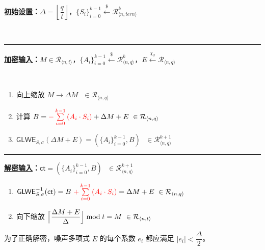 \begin{tcolorbox}[title={\textbf{\tboxlabel{\ref*{subsec:glwe-alternative}} GLWE 密码体制的另一种形式}}]

\textbf{\underline{初始设置}：}$\Delta = \left\lfloor\dfrac{q}{t}\right\rfloor$，$\{S_i\}_{i=0}^{k-1} \xleftarrow{\$} \mathcal{R}_{\langle n, \textit{tern} \rangle}^k$

$ $

\par\noindent\rule{\textwidth}{0.4pt}


\textbf{\underline{加密输入}：}$M \in \mathcal{R}_{\langle n, t \rangle}$，$\{A_i\}_{i=0}^{k-1} \xleftarrow{\$} \mathcal{R}_{\langle n,q \rangle}^{k}$，$E \xleftarrow{\chi_\sigma} \mathcal{R}_{\langle n,q \rangle}$

$ $

\begin{enumerate}
\item 向上缩放 $M \longrightarrow \Delta M \text { } \in \mathcal{R}_{\langle n, q\rangle}$

\item 计算 $B = \textcolor{red}{-\sum\limits_{i=0}^{k-1}{(A_i \cdot S_i)}} + \Delta  M + E \text{ } \in \mathcal{R}_{\langle n,q \rangle}$

\item $\textsf{GLWE}_{S,\sigma}(\Delta M + E) = (\{A_i\}_{i=0}^{k-1}, B) \text{ } \in \mathcal{R}_{\langle n,q \rangle}^{k + 1}$ 

\end{enumerate}

\par\noindent\rule{\textwidth}{0.4pt}


\textbf{\underline{解密输入}：}$\textsf{ct} = (\{A_i\}_{i=0}^{k-1}, B) \text{ } \in \mathcal{R}_{\langle n,q \rangle}^{k + 1}$

\begin{enumerate}
\item $\textsf{GLWE}^{-1}_{S,\sigma}(\textsf{ct}) = B \text{ } \textcolor{red}{ + \sum\limits_{i=0}^{k-1}{(A_i \cdot S_i)}} = \Delta  M + E \text{ } \in \mathcal{R}_{\langle n,q \rangle}$

\item 向下缩放
$\Bigl\lceil \dfrac{ \Delta  M + E }{\Delta}\Bigr\rfloor \bmod t = M  \text{ } \in \mathcal{R}_{\langle n, t \rangle}$

\end{enumerate}

为了正确解密，噪声多项式 $E$ 的每个系数 $e_i$ 都应满足 $|e_i| < \dfrac{\Delta}{2}$。

\end{tcolorbox}


